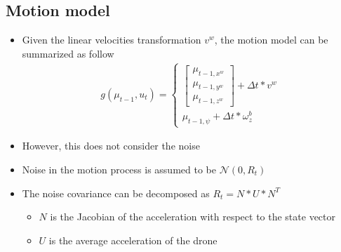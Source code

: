 \documentclass[serif]{beamer}
\begin{document}
    \subsection{Motion model}
    \begin{frame}
        \begin{itemize}
            \item{Given the linear velocities transformation $v^w$, the motion model can be summarized as follow
                \begin{align*}
                    g\left( \mu_{t-1}, u_t \right) = \begin{cases}
                        \begin{bmatrix}
                            \mu_{t-1, x^w} \\ \mu_{t-1, y^w} \\ \mu_{t-1, z^w}
                        \end{bmatrix}
                        + \Delta t * v^w \\
                        \mu_{t-1, \psi} + \Delta t * \omega_z^b
                    \end{cases}
                \end{align*}
            }
        \item{However, this does not consider the noise}
        \end{itemize}
    \end{frame}
    \begin{frame}
        \begin{itemize}
            \item{Noise in the motion process is assumed to be $\mathcal{N}\left(0, R_t\right)$}
            \item{The noise covariance can be decomposed as $R_t = N * U * N^T$
                \begin{itemize}
                    \item{$N$ is the Jacobian of the acceleration with respect to the state vector}
                    \item{$U$ is the average acceleration of the drone}
                \end{itemize}
            }

        \end{itemize}
    \end{frame}
\end{document}
